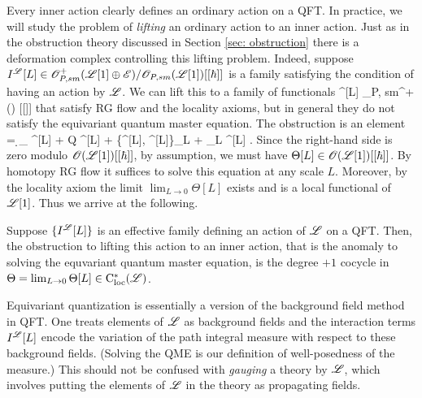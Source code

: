 \documentclass[10pt]{amsart}
\begin{document}
Every inner action clearly defines an ordinary action on a QFT.
In practice, we will study the problem of {\em lifting} an ordinary action to an inner action. 
Just as in the obstruction theory discussed in Section \ref{sec: obstruction} there is a deformation complex controlling this lifting problem. 
Indeed, suppose $I^{\mathscr L}[L] \in \mathscr O_{P, sm}^+(\mathscr L[1] \oplus \mathscr E) / \mathscr O_{P,sm} (\mathscr L[1]) [[\hbar]]$ is a family satisfying the condition of having an action by $\mathscr L$. 
We can lift this to a family of functionals
\ben
{}^{\sL}[L] \in \sO_{P, sm}^+(\sL[1] \oplus \sE) [[\hbar]] 
\een
that satisfy RG flow and the locality axioms, but in general they do not satisfy the equivariant quantum master equation. 
The obstruction is an element 
\ben
\Theta[L] = \d_{\sL} ^{\sL}[L] + Q ^{\sL}[L] +  \{^{\sL}[L], ^{\sL}[L]\}_L + \hbar \Delta_L ^{\sL}[L]  .
\een
Since the right-hand side is zero modulo $\mathscr O(\mathscr L[1])[[\hbar]]$, by assumption, we must have $\Theta[L] \in \mathscr O(\mathscr L[1])[[\hbar]]$. 
By homotopy RG flow it suffices to solve this equation at any scale $L$.
Moreover, by the locality axiom the limit $\lim_{L \to 0} \Theta[L]$ exists and is a local functional of $\mathscr L[1]$. 
Thus we arrive at the following.

\begin{lem}\label{lem: innner action}
Suppose $\{I^{\mathscr L}[L]\}$ is an effective family defining an action of $\mathscr L$ on a QFT.
Then, the obstruction to lifting this action to an inner action, that is the anomaly to solving the equvariant quantum master equation, is the degree $+1$ cocycle in $\Theta = \lim_{L \to 0} \Theta[L] \in {\rm C}_{\rm loc}^*(\mathscr L)$. 
\end{lem}


\begin{rmk}
Equivariant quantization is essentially a version of the background field method in QFT.
One treats elements of $\mathscr L$ as background fields and 
the interaction terms $I^\mathscr L[L]$ encode the variation of the path integral measure with respect to these background fields.
(Solving the QME is our definition of well-posedness of the measure.)
This should not be confused with {\em gauging} a theory by $\mathscr L$, which involves putting the elements of $\mathscr L$ in the theory as propagating fields.
\end{rmk}
\end{document}
